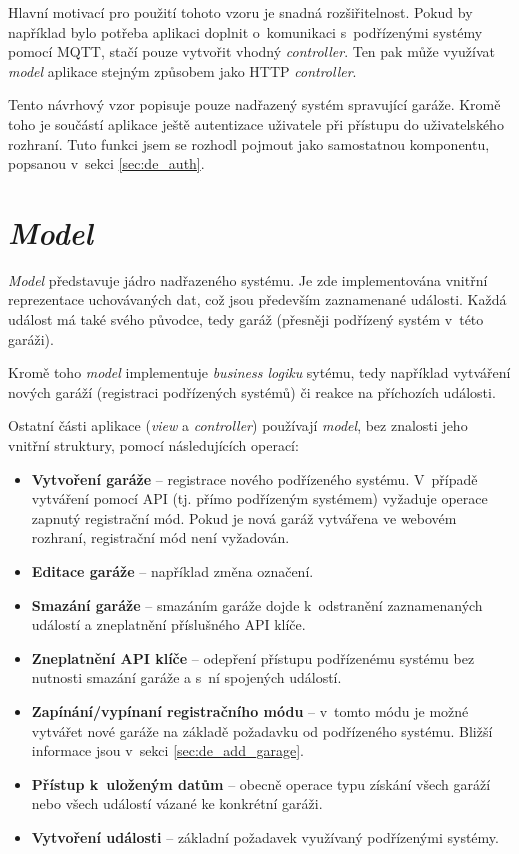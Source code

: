 Hlavní motivací pro použití tohoto vzoru je snadná rozšiřitelnost. Pokud by například bylo potřeba aplikaci doplnit o~komunikaci s~podřízenými systémy pomocí MQTT, stačí pouze vytvořit vhodný \textit{controller}. Ten pak může využívat \textit{model} aplikace stejným způsobem jako HTTP \textit{controller}.

Tento návrhový vzor popisuje pouze nadřazený systém spravující garáže. Kromě toho je součástí aplikace ještě autentizace uživatele při přístupu do uživatelského rozhraní. Tuto funkci jsem se rozhodl pojmout jako samostatnou komponentu, popsanou v~sekci \ref{sec:de_auth}.

\section{\textit{Model}}

\textit{Model} představuje jádro nadřazeného systému. Je zde implementována vnitřní reprezentace uchovávaných dat, což jsou především zaznamenané události. Každá událost má také svého původce, tedy garáž (přesněji podřízený systém v~této garáži).

Kromě toho \textit{model} implementuje \textit{business logiku} sytému, tedy například vytváření nových garáží (registraci podřízených systémů) či reakce na příchozích události.

Ostatní části aplikace (\textit{view} a \textit{controller}) používají \textit{model}, bez znalosti jeho vnitřní struktury, pomocí následujících operací:

\begin{itemize}
    \item \textbf{Vytvoření garáže} -- registrace nového podřízeného systému. V~případě vytváření pomocí API (tj. přímo podřízeným systémem) vyžaduje operace zapnutý registrační mód. Pokud je nová garáž vytvářena ve webovém rozhraní, registrační mód není vyžadován.
    \item \textbf{Editace garáže} -- například změna označení.
    \item \textbf{Smazání garáže} -- smazáním garáže dojde k~odstranění zaznamenaných událostí a zneplatnění příslušného API klíče.
    \item \textbf{Zneplatnění API klíče} -- odepření přístupu podřízenému systému bez nutnosti smazání garáže a s~ní spojených událostí.
    \item \textbf{Zapínání/vypínaní registračního módu} -- v~tomto módu je možné vytvářet nové garáže na základě požadavku od podřízeného systému. Bližší informace jsou v~sekci \ref{sec:de_add_garage}.
    \item \textbf{Přístup k~uloženým datům} -- obecně operace typu získání všech garáží nebo všech událostí vázané ke konkrétní garáži.
    \item \textbf{Vytvoření události} -- základní požadavek využívaný podřízenými systémy.
\end{itemize}

